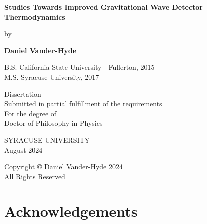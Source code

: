 \documentclass[12pt]{report}
\newcommand\signature[2]{%
    \hspace{10.0cm}\begin{minipage}{7.5cm}
    \noindent\vspace{2cm}\par
    \textbf{Approved:}\;\rule{6cm}{1pt}\par
    \hspace{3.0cm}\textbf{#1}\par
    \noindent\vspace{0.5cm}\par
    \hspace{0.5cm} \textbf{Date:} \hspace{0.4cm}\rule{6cm}{1pt}\par
    \end{minipage}}
\begin{document}
\begin{titlepage}
\begin{center}
       \vspace*{1cm}

       \textbf{\LARGE Studies Towards Improved Gravitational Wave Detector Thermodynamics}

       \vspace{0.5cm}
       {\large by}
            
       \vspace{0.5cm}

       \textbf{\large Daniel Vander-Hyde}


       \vspace{0.5cm}
       {\large B.S. California State University - Fullerton, 2015}
       \\
       {\large M.S. Syracuse University, 2017}
       
       \vspace{1.0cm}
             
       {\large
       Dissertation \\ 
       Submitted in partial fulfillment of the requirements\\
       For the degree of \\
       Doctor of Philosophy in Physics}

       \vspace{0.5cm}

       {\large \uppercase{Syracuse University}}
       \\
       August 2024
    \end{center}
	
	
\end{titlepage}

\clearpage

\thispagestyle{empty}
\vspace*{0.25\textheight}
\begin{center}
Copyright \copyright \; Daniel Vander-Hyde 2024\\
All Rights Reserved
\end{center}
\clearpage

\noindent


\chapter*{Acknowledgements}
\fancyhf{}
\renewcommand{\headrulewidth}{0pt}
\end{document}
